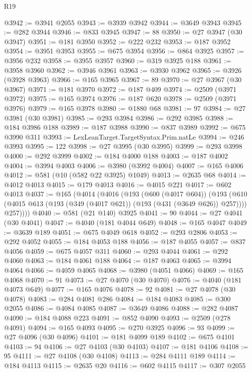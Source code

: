 \begin{lexlean}{R19}
\begin{coremodule}
@3942 := @3941 @2055
@3943 := @3939 @3942
@3944 := @3649 @3943
@3945 := @282 @3944
@3946 := @833 @3945
@3947 := 88
@3950 := @27 @3947 (@30 @3947)
@3951 := @181 @3950
@3952 := @222 @232
@3953 := @187 @3952
@3954 := @3951 @3953
@3955 := @675 @3954
@3956 := @864 @3925
@3957 := @3956 @232
@3958 := @3955 @3957
@3960 := @319 @3925 @188
@3961 := @3958 @3960
@3962 := @3946 @3961
@3963 := @3930 @3962
@3965 := @3926 (@3928 @3963)
@3966 := @165 @3965
@3967 := 89
@3970 := @27 @3967 (@30 @3967)
@3971 := @181 @3970
@3972 := @187 @409
@3974 := @2509 (@3971 @3972)
@3975 := @165 @3974
@3976 := @187 @620
@3978 := @2509 (@3971 @3976)
@3979 := @165 @3978
@3980 := @1880 @68
@3981 := 97
@3984 := @27 @3981 (@30 @3981)
@3985 := @293 @3984
@3986 := @292 @3985
@3988 := @184 @3986 @188
@3989 := @187 @3988
@3990 := @837 @3989
@3992 := @675 @3990 @311
@3993 := LexLeanTarget.TargetSyntax.Prim.natLe
@3994 := @246 @3993
@3995 := 122
@3998 := @27 @3995 (@30 @3995)
@3999 := @293 @3998
@4000 := @292 @3999
@4002 := @184 @4000 @188
@4003 := @187 @4002
@4004 := @3994 @4003
@4006 := @3980 (@3992 @4004)
@4007 := @165 @4006
@4012 := @581 (@10 (@582 @22 @3925) @1049)
@4013 := @2635 @68
@4014 := @4012 @4013
@4015 := @179 @4013
@4016 := @4015 @221
@4017 := @602 @4013
@4037 := @165
    (@4014
      (@4016
        (@193
          (@600 (@4017 @604))
          (@193
            (@610 (@4015 @613 (@193 (@349 (@4017 @621)) (@193 (@431 (@3649 @626)) @257))))
            @257))))
@4040 := @581 (@21 @140) @3925
@4041 := 90
@4044 := @27 @4041 (@30 @4041)
@4047 := @4040 (@181 @4044 @649)
@4048 := @165 @4047
@4049 := @3639 @189
@4051 := @675 @4049 @618
@4052 := @293 @2806
@4053 := @292 @4052
@4055 := @184 @4053 @188
@4056 := @187 @4055
@4057 := @837 @4056
@4059 := @675 @4057 @311
@4060 := @293 @4044
@4061 := @292 @4060
@4063 := @184 @4061 @188
@4064 := @187 @4063
@4065 := @3994 @4064
@4066 := @4059 @4065
@4068 := @3980 (@4051 @4066)
@4069 := @165 @4068
@4070 := 91
@4073 := @27 @4070 (@30 @4070)
@4076 := @4040 (@181 @4073 @649)
@4077 := @165 @4076
@4078 := 92
@4081 := @27 @4078 (@30 @4078)
@4083 := @284 @4081 @286
@4084 := @184 @4083
@4085 := @300 @2055
@4086 := @4084 @4085
@4087 := @3649 @4086
@4088 := @282 @4087
@4090 := @184 @4088 @223
@4091 := @852 @4090
@4093 := @2509 (@278 @4091)
@4094 := @165 @4093
@4095 := @270 @3925
@4096 := 93
@4099 := @27 @4096 (@30 @4096)
@4101 := @181 @4099 @189
@4102 := @675 @4101
@4103 := 94
@4106 := @27 @4103 (@30 @4103)
@4107 := @181 @4106
@4108 := 95
@4111 := @27 @4108 (@30 @4108)
@4113 := @284 @4111 @189
@4114 := @184 @4113
@4115 := @2635 @20
@4116 := @602 @4115
@4117 := @307 @2055

\end{coremodule}
\end{lexlean}
